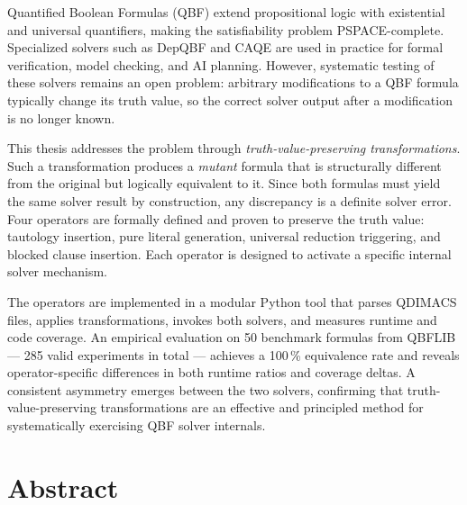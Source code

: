\vspace{-0.5cm}


Quantified Boolean Formulas (QBF) extend propositional logic with
existential and universal quantifiers, making the satisfiability
problem PSPACE-complete. Specialized solvers such as DepQBF and
CAQE are used in practice for formal verification, model checking,
and AI planning. However, systematic testing of these solvers
remains an open problem: arbitrary modifications to a QBF formula
typically change its truth value, so the correct solver output
after a modification is no longer known.

This thesis addresses the problem through
\emph{truth-value-preserving transformations}. Such a transformation
produces a \emph{mutant} formula that is structurally different from
the original but logically equivalent to it. Since both formulas
must yield the same solver result by construction, any discrepancy
is a definite solver error. Four operators are formally defined and
proven to preserve the truth value: tautology insertion, pure
literal generation, universal reduction triggering, and blocked
clause insertion. Each operator is designed to activate a specific
internal solver mechanism.

The operators are implemented in a modular Python tool that parses
QDIMACS files, applies transformations, invokes both solvers, and
measures runtime and code coverage. An empirical evaluation on
50 benchmark formulas from QBFLIB --- 285 valid experiments in
total --- achieves a 100\,\% equivalence rate and reveals
operator-specific differences in both runtime ratios and coverage
deltas. A consistent asymmetry emerges between the two solvers,
confirming that truth-value-preserving transformations are an
effective and principled method for systematically exercising QBF
solver internals.

\vspace{-0.5cm}

{
	\let\clearpage\relax
	\ifeng
	\else
		\chapter*{Abstract}
	\fi


\vspace{-0.5cm}

	\ifeng
	\else
	\fi
}


